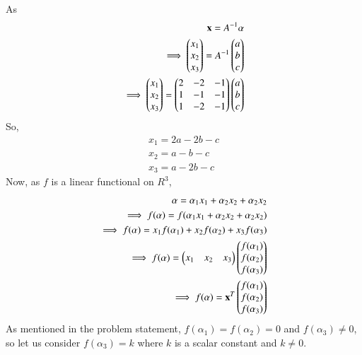 \documentclass[journal,12pt,twocolumn]{IEEEtran}
\begin{document}
As
\begin{align}
\mathbf{x} = A^{-1} \mathbf{\alpha}\\
\implies \begin{pmatrix}x_1\\x_2\\x_3\end{pmatrix}= A^{-1} \begin{pmatrix}a\\b\\c\end{pmatrix}\\
\implies \begin{pmatrix}x_1\\x_2\\x_3\end{pmatrix}= \begin{pmatrix}2 & -2 & -1\\1 & -1 & -1\\1 & -2 & -1\end{pmatrix} \begin{pmatrix}a\\b\\c\end{pmatrix}
\end{align}
So, 
\begin{align}
x_1 = 2a-2b-c\\
x_2= a-b-c \\
x_3= a-2b-c
\end{align}
Now, as $f$ is a linear functional on $R^3$,
\begin{align}
\mathbf{\alpha} = \alpha_1 x_1 + \alpha_2 x_2 + \alpha_2 x_2\\
\implies f(\alpha) = f(\alpha_1 x_1 + \alpha_2 x_2 + \alpha_2 x_2)\\
\implies f(\alpha) = x_1 f(\alpha_1) + x_2f(\alpha_2)+ x_3f(\alpha_3)\\
\implies f(\alpha) = \begin{pmatrix}x_1 & x_2 & x_3\end{pmatrix} \begin{pmatrix}f(\alpha_1)\\f(\alpha_2)\\f(\alpha_3)\end{pmatrix}\\
\implies f(\alpha) = \mathbf{x}^T \begin{pmatrix}f(\alpha_1)\\f(\alpha_2)\\f(\alpha_3)\end{pmatrix}
\end{align}
As mentioned in the problem statement, $f(\alpha_1)=f(\alpha_2)=0$ and $f(\alpha_3)\neq 0$, so let us consider $f(\alpha_3)= k$ where $k$ is a scalar constant and $k \neq 0$.
\end{document}
